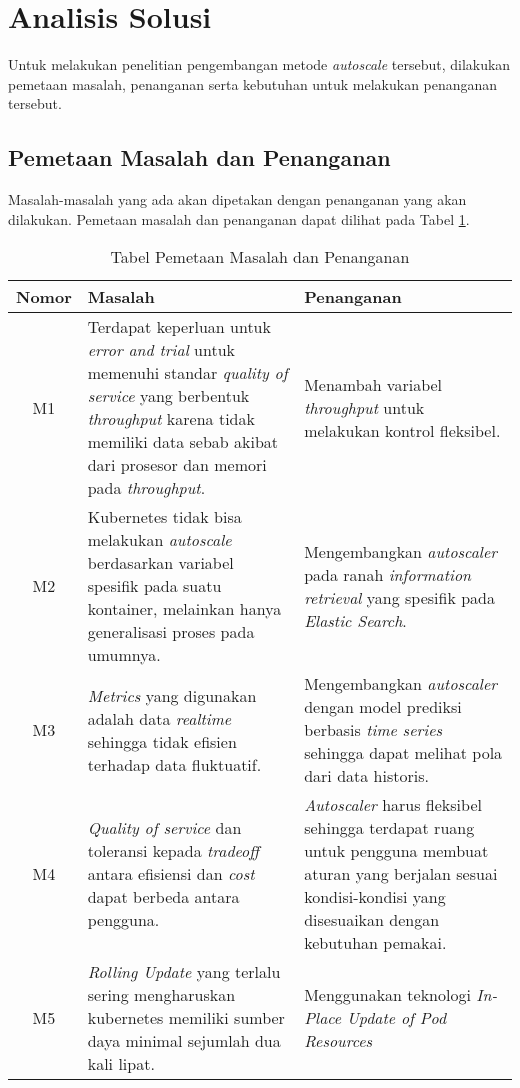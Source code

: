 \section{Analisis Solusi}

Untuk melakukan penelitian pengembangan metode \textit{autoscale} tersebut, dilakukan pemetaan masalah, penanganan serta kebutuhan untuk melakukan penanganan tersebut.

\subsection{Pemetaan Masalah dan Penanganan}
\label{sec:pemetaan-masalah}
Masalah-masalah yang ada akan dipetakan dengan penanganan yang akan dilakukan. Pemetaan masalah dan penanganan dapat dilihat pada Tabel \ref{tab:pemetaan-masalah}.

\begin{table}[h]
    \caption{Tabel Pemetaan Masalah dan Penanganan}
    \vspace{0.25cm}
    \begin{center}
        \begin{tabular}{|c|p{2.5in}|p{2.5in}|}
            \rowcolor{gray!30}
            \hline
            \textbf{Nomor} & \textbf{Masalah} & \textbf{Penanganan} \tabularnewline
            \hline
            M1 & Terdapat keperluan untuk \textit{error and trial} untuk memenuhi standar \textit{quality of service} yang berbentuk \textit{throughput} karena tidak memiliki data sebab akibat dari prosesor dan memori pada \textit{throughput}. &
            Menambah variabel \textit{throughput} untuk melakukan kontrol fleksibel.
            \tabularnewline

            M2 &
            Kubernetes tidak bisa melakukan \textit{autoscale} berdasarkan variabel spesifik pada suatu kontainer, melainkan hanya generalisasi proses pada umumnya. &
            Mengembangkan \textit{autoscaler} pada ranah \textit{information retrieval} yang spesifik pada \textit{Elastic Search}. \tabularnewline

            M3 &
            \textit{Metrics} yang digunakan adalah data \textit{realtime} sehingga tidak efisien terhadap data fluktuatif. &
            Mengembangkan \textit{autoscaler} dengan model prediksi berbasis \textit{time series} sehingga dapat melihat pola dari data historis.\tabularnewline

            M4 & \textit{Quality of service} dan toleransi kepada \textit{tradeoff} antara efisiensi dan \textit{cost} dapat berbeda antara pengguna. &
            \textit{Autoscaler} harus fleksibel sehingga terdapat ruang untuk pengguna membuat aturan yang berjalan sesuai kondisi-kondisi yang disesuaikan dengan kebutuhan pemakai.\tabularnewline

            M5 & \textit{Rolling Update} yang terlalu sering mengharuskan kubernetes memiliki sumber daya minimal sejumlah dua kali lipat. &
            Menggunakan teknologi \textit{In-Place Update of Pod Resources} \tabularnewline
            \hline
        \end{tabular}
    \end{center}
    \label{tab:pemetaan-masalah}
\end{table}